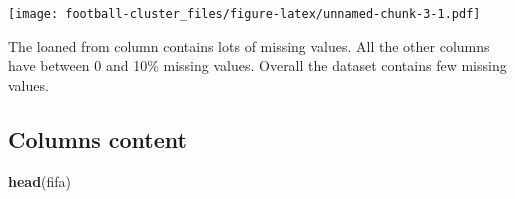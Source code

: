\documentclass[]{article}
\newenvironment{Shaded}{\begin{snugshade}}{\end{snugshade}}
\newcommand{\ControlFlowTok}[1]{\textcolor[rgb]{0.13,0.29,0.53}{\textbf{#1}}}
\newcommand{\DataTypeTok}[1]{\textcolor[rgb]{0.13,0.29,0.53}{#1}}
\newcommand{\DecValTok}[1]{\textcolor[rgb]{0.00,0.00,0.81}{#1}}
\newcommand{\KeywordTok}[1]{\textcolor[rgb]{0.13,0.29,0.53}{\textbf{#1}}}
\newcommand{\NormalTok}[1]{#1}
\newcommand{\OperatorTok}[1]{\textcolor[rgb]{0.81,0.36,0.00}{\textbf{#1}}}
\newcommand{\StringTok}[1]{\textcolor[rgb]{0.31,0.60,0.02}{#1}}
\begin{document}
\begin{Shaded}
\end{Shaded}

\texttt{[image: football-cluster\_files/figure-latex/unnamed-chunk-3-1.pdf]}

The loaned from column contains lots of missing values. All the other
columns have between 0 and 10\% missing values. Overall the dataset
contains few missing values.

\hypertarget{columns-content}{%
\subsection{Columns content}\label{columns-content}}

\begin{Shaded}
\begin{Highlighting}[]
\KeywordTok{head}\NormalTok{(fifa)}
\end{Highlighting}
\end{Shaded}
\end{document}
